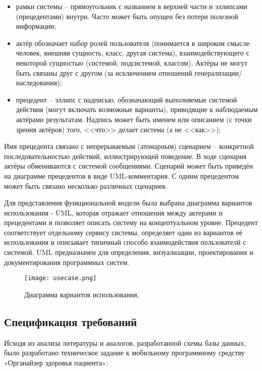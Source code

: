 \begin{itemize}
  \item рамки системы – прямоугольник с названием в верхней части и эллипсами (прецедентами) внутри. Часто может быть опущен без потери полезной информации;
  \item актёр обозначает набор ролей пользователя (понимается в широком смысле: человек, внешняя сущность, класс, другая система), взаимодействующего с некоторой сущностью (системой, подсистемой, классом). Актёры не могут быть связаны друг с другом (за исключением отношений генерализации/наследования);
  \item  прецедент – эллипс с надписью, обозначающий выполняемые системой действия (могут включать возможные варианты), приводящие к наблюдаемым актёрами результатам. Надпись может быть именем или описанием (с точки зрения актёров) того, <<что>> делает система (а не <<как>>);
\end{itemize}

Имя прецедента связано с непрерываемым (атомарным) сценарием – конкретной последовательностью действий, иллюстрирующей поведение. В ходе сценария актёры обмениваются с системой сообщениями. Сценарий  может быть приведён на диаграмме прецедентов в виде UML-комментария. С одним прецедентом может быть связано несколько различных сценариев.

Для представления функциональной модели была выбрана диаграмма вариантов использования - UML, которая отражает отношения между актерами и прецедентами и позволяет описать систему на концептуальном уровне. Прецедент соответствует отдельному сервису системы, определяет один из вариантов её использования и описывает типичный  способо взаимодействия пользователй с системой. UML предназначен для определения, визуализации, проектирования и документирования программных систем.

\begin{figure}[ht]
\centering
  \texttt{[image: usecase.png]}  
  \caption{ Диаграмма вариантов использования. }
  \label{fig:domain:manual_structure:credit_usecase}
\end{figure}


\subsection{Спецификация требований }
\label{sub:practice:tab_task}

Исходя из анализа литературы и аналогов, разработанной схемы базы данных, было разработано техническое задание к мобильному программному средству «Органайзер здоровья пациента»: 

